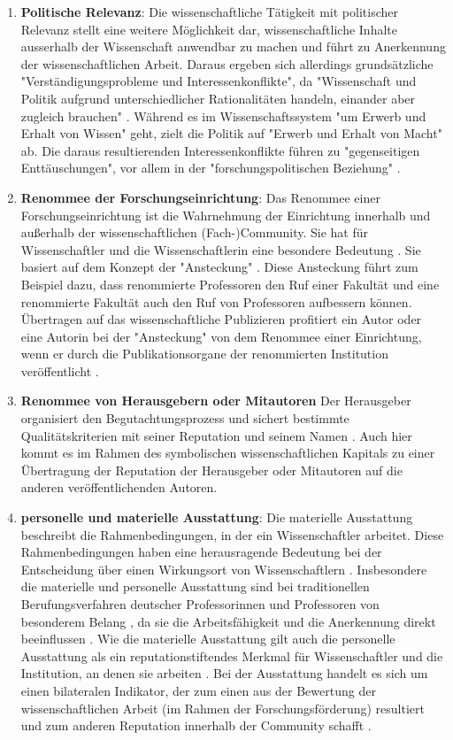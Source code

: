\begin{enumerate}
\item \textbf{Politische Relevanz}: Die wissenschaftliche Tätigkeit mit politischer Relevanz stellt eine weitere Möglichkeit dar, wissenschaftliche Inhalte ausserhalb der Wissenschaft anwendbar zu machen und führt zu Anerkennung der wissenschaftlichen Arbeit. Daraus ergeben sich allerdings grundsätzliche "Verständigungsprobleme und Interessenkonflikte", da  "Wissenschaft und Politik aufgrund unterschiedlicher Rationalitäten handeln, einander aber zugleich brauchen" \cite{Mayntz_1996}. Während es im Wissenschaftssystem "um Erwerb und Erhalt von Wissen" geht, zielt die Politik auf "Erwerb und Erhalt von Macht" \cite{Mayntz_1996} ab. Die daraus resultierenden Interessenkonflikte führen zu "gegenseitigen Enttäuschungen", vor allem in der "forschungspolitischen Beziehung" \cite{Mayntz_1996}.
\item \textbf{Renommee der Forschungseinrichtung}: Das Renommee einer Forschungseinrichtung ist die Wahrnehmung der Einrichtung innerhalb und außerhalb der wissenschaftlichen (Fach-)Community. Sie hat für Wissenschaftler und die Wissenschaftlerin eine besondere Bedeutung \cite{mayntz_2008_wissensproduktion}. Sie basiert auf dem Konzept der "Ansteckung" \cite{luhmann_1970_selbststeuerung}. Diese Ansteckung führt zum Beispiel dazu, dass renommierte Professoren den Ruf einer Fakultät und eine renommierte Fakultät auch den Ruf von Professoren aufbessern können. Übertragen auf das wissenschaftliche Publizieren profitiert ein Autor oder eine Autorin bei der "Ansteckung" von dem Renommee einer Einrichtung, wenn er durch die Publikationsorgane der renommierten Institution veröffentlicht \cite{lutz_2012_zugang}.
\item \textbf{Renommee von Herausgebern oder Mitautoren} Der Herausgeber organisiert den Begutachtungsprozess und sichert bestimmte Qualitätskriterien mit seiner Reputation und seinem Namen \cite{mueller_2009_peerreview}. Auch hier kommt es im Rahmen des symbolischen wissenschaftlichen Kapitals zu einer Übertragung der Reputation der Herausgeber oder Mitautoren auf die anderen veröffentlichenden Autoren.
\item \textbf{personelle und materielle Ausstattung}: Die materielle Ausstattung beschreibt die Rahmenbedingungen, in der ein Wissenschaftler arbeitet. Diese Rahmenbedingungen haben eine herausragende Bedeutung bei der Entscheidung über einen Wirkungsort von Wissenschaftlern \cite{mayntz_2008_wissensproduktion}. Insbesondere die materielle und personelle Ausstattung sind bei traditionellen Berufungsverfahren deutscher Professorinnen und Professoren von besonderem Belang \cite{himpele_2011_job}, da sie die Arbeitsfähigkeit und die Anerkennung direkt beeinflussen \cite{suche}. Wie die materielle Ausstattung gilt auch die personelle Ausstattung als ein reputationstiftendes Merkmal für Wissenschaftler und die Institution, an denen sie arbeiten \cite{mayntz_2008_wissensproduktion}. Bei der Ausstattung handelt es sich um einen bilateralen Indikator, der zum einen aus der Bewertung der wissenschaftlichen Arbeit (im Rahmen der Forschungsförderung) resultiert \cite{Herb_vermessung_2008} und  zum anderen Reputation innerhalb der Community schafft \cite{mayntz_2008_wissensproduktion}.

\end{enumerate}

